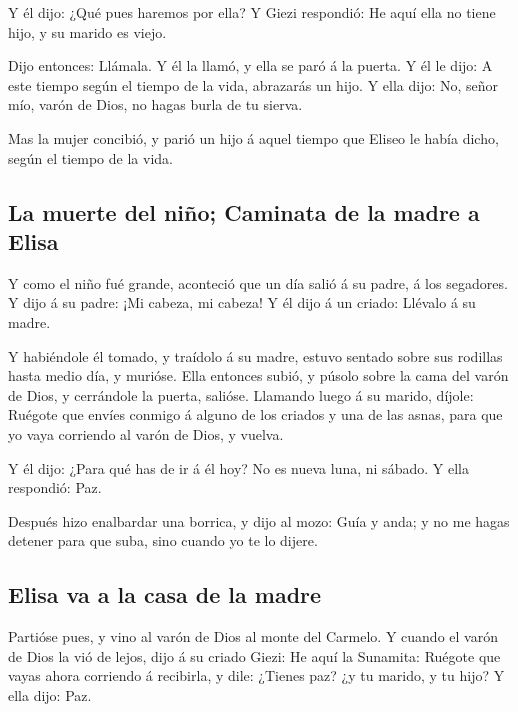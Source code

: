  Y él dijo: ¿Qué pues haremos por ella? Y Giezi
respondió: He aquí ella no tiene hijo, y su marido es viejo.

 Dijo entonces: Llámala. Y él la llamó, y ella se paró á
la puerta.  Y él le dijo: A este tiempo según el tiempo
de la vida, abrazarás un hijo. Y ella dijo: No, señor mío, varón de
Dios, no hagas burla de tu sierva.

 Mas la mujer concibió, y parió un hijo á aquel tiempo
que Eliseo le había dicho, según el tiempo de la vida.

\hypertarget{la-muerte-del-niuxf1o-caminata-de-la-madre-a-elisa}{%
\subsection{La muerte del niño; Caminata de la madre a
Elisa}\label{la-muerte-del-niuxf1o-caminata-de-la-madre-a-elisa}}

 Y como el niño fué grande, aconteció que un día salió á
su padre, á los segadores.  Y dijo á su padre: ¡Mi
cabeza, mi cabeza! Y él dijo á un criado: Llévalo á su madre.

 Y habiéndole él tomado, y traídolo á su madre, estuvo
sentado sobre sus rodillas hasta medio día, y murióse. 
Ella entonces subió, y púsolo sobre la cama del varón de Dios, y
cerrándole la puerta, salióse.  Llamando luego á su
marido, díjole: Ruégote que envíes conmigo á alguno de los criados y una
de las asnas, para que yo vaya corriendo al varón de Dios, y vuelva.

 Y él dijo: ¿Para qué has de ir á él hoy? No es nueva
luna, ni sábado. Y ella respondió: Paz.

 Después hizo enalbardar una borrica, y dijo al mozo:
Guía y anda; y no me hagas detener para que suba, sino cuando yo te lo
dijere.

\hypertarget{elisa-va-a-la-casa-de-la-madre}{%
\subsection{Elisa va a la casa de la
madre}\label{elisa-va-a-la-casa-de-la-madre}}

 Partióse pues, y vino al varón de Dios al monte del
Carmelo. Y cuando el varón de Dios la vió de lejos, dijo á su criado
Giezi: He aquí la Sunamita:  Ruégote que vayas ahora
corriendo á recibirla, y dile: ¿Tienes paz? ¿y tu marido, y tu hijo? Y
ella dijo: Paz.

